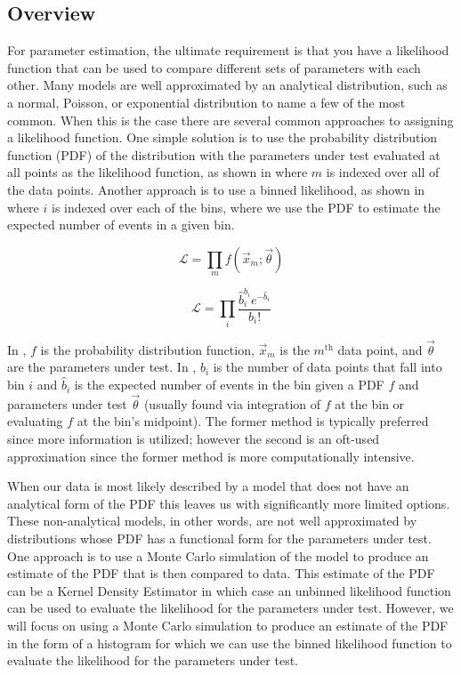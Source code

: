 \subsection{Overview}

For parameter estimation, the ultimate requirement is that you have a likelihood function that can be used to compare different sets of parameters with each other.  Many models are well approximated by an analytical distribution, such as a normal, Poisson, or exponential distribution to name a few of the most common.  When this is the case there are several common approaches to assigning a likelihood function.  One simple solution is to use the probability distribution function (PDF) of the distribution with the parameters under test evaluated at all points as the likelihood function, as shown in  where $m$ is indexed over all of the data points.  Another approach is to use a binned likelihood, as shown in  where $i$ is indexed over each of the bins, where we use the PDF to estimate the expected number of events in a given bin. 


\begin{equation}
        \label{eqn:gpu_unbinned_likelihood}
        \mathcal{L} = \prod_m f(\vec{x}_m; \vec{\theta})
\end{equation}

\begin{equation}
        \label{eqn:gpu_binned_likelihood}
        \mathcal{L} = \prod_i \frac{\hat{b}_i^{b_i} e^{-\hat{b}_i}}{b_i!}
\end{equation}


In , $f$ is the probability distribution function, $\vec{x}_m$ is the $m^{\textrm{th}}$ data point, and $\vec{\theta}$ are the parameters under test.  In , $b_i$ is the number of data points that fall into bin $i$ and $\hat{b}_i$ is the expected number of events in the bin given a PDF $f$ and parameters under test $\vec{\theta}$ (usually found via integration of $f$ at the bin or evaluating $f$ at the bin's midpoint).  The former method is typically preferred since more information is utilized; however the second is an oft-used approximation since the former method is more computationally intensive.


When our data is most likely described by a model that does not have an analytical form of the PDF this leaves us with significantly more limited options.  These non-analytical models, in other words, are not well approximated by distributions whose PDF has a functional form for the parameters under test.  One approach is to use a Monte Carlo simulation of the model to produce an estimate of the PDF that is then compared to data.  This estimate of the PDF can be a Kernel Density Estimator \cite{terrell1992variable} in which case an unbinned likelihood function can be used to evaluate the likelihood for the parameters under test.  However, we will focus on using a Monte Carlo simulation to produce an estimate of the PDF in the form of a histogram for which we can use the binned likelihood function to evaluate the likelihood for the parameters under test.



